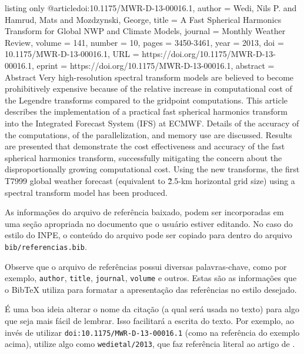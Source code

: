 \begin{texexp}{listing only}
@article{doi:10.1175/MWR-D-13-00016.1,
author   = {Wedi, Nils P. and Hamrud, Mats and Mozdzynski, George},
title    = {A Fast Spherical Harmonics Transform for Global NWP
            and Climate Models},
journal  = {Monthly Weather Review},
volume   = {141},
number   = {10},
pages    = {3450-3461},
year     = {2013},
doi      = {10.1175/MWR-D-13-00016.1},
URL      = {https://doi.org/10.1175/MWR-D-13-00016.1},
eprint   = {https://doi.org/10.1175/MWR-D-13-00016.1},
abstract = {Abstract Very high-resolution spectral transform models are believed to become prohibitively expensive because of the relative increase in computational cost of the Legendre transforms compared to the gridpoint computations. This article describes the implementation of a practical fast spherical harmonics transform into the Integrated Forecast System (IFS) at ECMWF. Details of the accuracy of the computations, of the parallelization, and memory use are discussed. Results are presented that demonstrate the cost effectiveness and accuracy of the fast spherical harmonics transform, successfully mitigating the concern             about the disproportionally growing computational cost. Using the new transforms, the first T7999 global weather forecast (equivalent to \~2.5-km horizontal grid size) using a spectral transform model has been produced.}
}
\end{texexp}

As informações do arquivo de referência baixado, podem ser incorporadas em uma seção apropriada no documento que o usuário estiver editando. No caso do estilo do INPE, o conteúdo do arquivo pode ser copiado para dentro do arquivo {\tt bib/referencias.bib}.

Observe que o arquivo de referências possui diversas palavras-chave, como por exemplo, {\tt author}, {\tt title}, {\tt journal}, {\tt volume} e outros. Estas são as informações que o Bib\TeX{} utiliza para formatar a apresentação das referências no estilo desejado.

\begin{marker}
  É uma boa ideia alterar o nome da citação (a qual será usada no texto) para algo que seja mais fácil de lembrar. Isso facilitará a escrita do texto. Por exemplo, ao invés de utilizar {\tt doi:10.1175/MWR-D-13-00016.1} (como na referência do exemplo acima), utilize algo como {\tt wedietal/2013}, que faz referência literal ao artigo de .
\end{marker}

